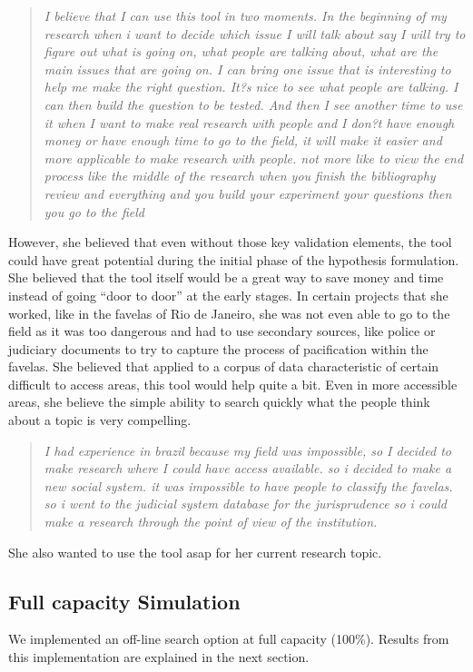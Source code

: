 \documentclass{sigchi}
\begin{document}
\begin{quote}
{\em
I believe that I can use this tool in two moments. In the beginning of my research when i want to decide which issue I will talk about say I will try to figure out what is going on, what people are talking about, what are the main issues that are going on. I can bring one issue that is  interesting to help me make the right question. It?s nice to see what people are talking. I can then build the question to be tested. And then I see another time to use it when I want to make real research with people and I don?t have enough money or have enough time to go to the field, it will make it easier and more applicable to make research with people. not more like to view the end process like the middle of the research when you finish the bibliography review and everything and you build your experiment your questions then you go to the field
}\end{quote}

However, she believed that even without those key validation elements, the tool could have great potential during the initial phase of the hypothesis formulation. She believed that the tool itself would be a great way to save money and time instead of going ``door to door'' at the early stages. In certain projects that she worked, like in the favelas of Rio de Janeiro, she was not even able to go to the field as it was too dangerous and had to use secondary sources, like police or judiciary documents to try to capture the process of pacification within the favelas. She believed that applied to a corpus of data characteristic of certain difficult to access areas, this tool would help quite a bit. Even in more accessible areas, she believe the simple ability to search quickly what the people think about a topic is very compelling. 

\begin{quote}
{\em
I had experience in brazil because my field was impossible, so I decided to make research where I could have access available. so i decided to make a new social system. it was impossible to have people to classify the favelas. so i went to the judicial system database for the jurisprudence so i could make a research through the point of view of the institution.
}\end{quote}

She also wanted to use the tool asap for her current research topic.

\subsection{Full capacity Simulation}
We implemented an off-line search option at full capacity (100\%). Results from this implementation are explained in the next section.
\end{document}
